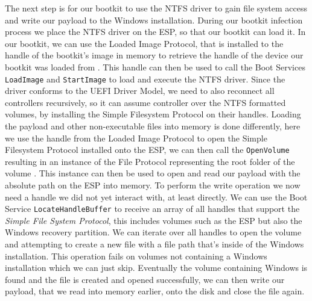 The next step is for our bootkit to use the NTFS driver to gain file system access and write our payload to the Windows installation. During our bootkit infection process we place the NTFS driver on the \ac{ESP}, so that our bootkit can load it. In our bootkit, we can use the Loaded Image Protocol, that is installed to the handle of the bootkit's image in memory to retrieve the handle of the device our bootkit was loaded from \cite[9.1 EFI Loaded Image Protocol]{uefi-spec}. This handle can then be used to call the Boot Services \lstinline{LoadImage} and \lstinline{StartImage} to load and execute the NTFS driver. Since the driver conforms to the UEFI Driver Model, we need to also reconnect all controllers recursively, so it can assume controller over the NTFS formatted volumes, by installing the Simple Filesystem Protocol on their handles. Loading the payload and other non-executable files into memory is done differently, here we use the handle from the Loaded Image Protocol to open the Simple Filesystem Protocol installed onto the \ac{ESP}, we can then call the \lstinline{OpenVolume} resulting in an instance of the File Protocol representing the root folder of the volume \cite[13.4]{uefi-spec}. This instance can then be used to open and read our payload with the absolute path on the \ac{ESP} into memory.
To perform the write operation we now need a handle we did not yet interact with, at least directly. We can use the Boot Service \lstinline{LocateHandleBuffer} to receive an array of all handles that support the \emph{Simple File System Protocol}, this includes volumes such as the \ac{ESP} but also the Windows recovery partition. We can iterate over all handles to open the volume and attempting to create a new file with a file path that's inside of the Windows installation. This operation fails on volumes not containing a Windows installation which we can just skip. Eventually the volume containing Windows is found and the file is created and opened successfully, we can then write our payload, that we read into memory earlier, onto the disk and close the file again.


